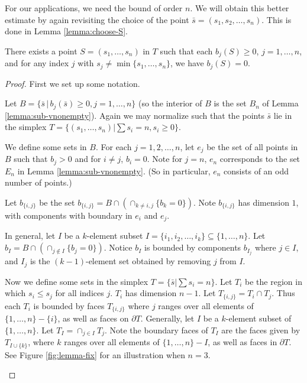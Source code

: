 For our applications, we need the bound of order $n$.  We will obtain
this better estimate by again revisiting the choice of the point
$\bar{s}=(s_1, s_2, \dots, s_n)$.  This is done in Lemma
\ref{lemma:choose-S}.  


\begin{lemma}
  There exists a point $S=(s_1, \dots, s_n)$ in $T$ such that each
  $b_j(S)\geq 0$, $j=1, \dots, n$, and for any index $j$ with $s_j
  \neq \min\{s_1, \dots, s_n\}$, we have $b_j(S)=0$.
\label{lemma:choose-S}
\end{lemma}

\begin{proof}

First we set up some notation.

\begin{notation}
  Let $B = \{\bar{s}\, |\, b_j(\bar{s}) \geq 0, j=1, \dots, n\}$ (so
  the interior of $B$ is the set $B_n$ of Lemma
  \ref{lemma:sub-vnonempty}).  Again we may normalize such that the
  points $\bar{s}$ lie in the simplex $T= \{(s_1,\dots,s_n)| \sum s_i
  = n, s_i\geq 0\}$.
  
  We define some sets in $B$.  For each $j=1, 2, \dots, n$, let $e_j$
  be the set of all points in $B$ such that $b_j>0$ and for $i\neq j$,
  $b_i=0$.  Note for $j=n$, $e_n$ corresponds to the set $E_n$ in
  Lemma \ref{lemma:sub-vnonempty}.  (So in particular, $e_n$ consists
  of an odd number of points.)
  
  Let $b_{\{i,j\}}$ be the set $b_{\{i,j\}} = B\cap (\cap_{k\neq i,j}
  \{b_k=0\})$.  Note $b_{\{i,j\}}$ has dimension $1$, with components with
  boundary in $e_i$ and $e_j$.
  
  In general, let $I$ be a $k$-element subset $I= \{i_1, i_2, \dots,
  i_k\} \subseteq \{1, \dots, n\}$.  Let $b_I = B\cap(\cap_{j\notin I}
  \{b_j=0\})$.  Notice $b_I$ is bounded by components $b_{I_j}$ where
  $j\in I$, and $I_j$ is the $(k-1)$-element set obtained by removing
  $j$ from $I$.
  
  Now we define some sets in the simplex $T = \{\bar{s}| \sum
  s_i=n\}$.  Let $T_i$ be the region in which $s_i\leq s_j$ for all
  indices $j$.  $T_i$ has dimension $n-1$.  Let $T_{\{i,j\}} = T_i
  \cap T_j$.  Thus each $T_i$ is bounded by faces $T_{\{i,j\}}$ where
  $j$ ranges over all elements of $\{1, \dots, n\}-\{i\}$, as well as
  faces on $\partial T$.  Generally,
  let $I$ be a $k$-element subset of $\{1, \dots, n\}$.  Let $T_I =
  \cap_{j\in I} T_j$.  Note the boundary faces of $T_I$ are the faces
  given by $T_{I\cup\{k\}}$, where $k$ ranges over all elements of
  $\{1, \dots, n\} - I$, as well as faces in $\partial T$.  See Figure
  \ref{fig:lemma-fix} for an illustration when $n=3$.
\end{notation}


\end{proof}
